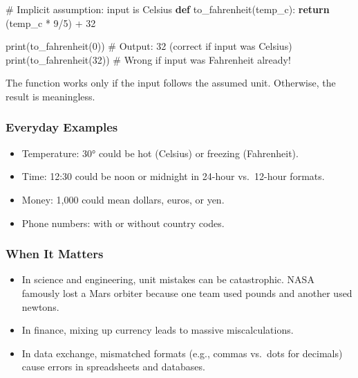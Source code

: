 \documentclass[
  letterpaper,
  DIV=11,
  numbers=noendperiod]{scrreprt}
\newenvironment{Shaded}{\begin{snugshade}}{\end{snugshade}}
\newcommand{\BuiltInTok}[1]{\textcolor[rgb]{0.00,0.23,0.31}{#1}}
\newcommand{\CommentTok}[1]{\textcolor[rgb]{0.37,0.37,0.37}{#1}}
\newcommand{\ControlFlowTok}[1]{\textcolor[rgb]{0.00,0.23,0.31}{\textbf{#1}}}
\newcommand{\DecValTok}[1]{\textcolor[rgb]{0.68,0.00,0.00}{#1}}
\newcommand{\KeywordTok}[1]{\textcolor[rgb]{0.00,0.23,0.31}{\textbf{#1}}}
\newcommand{\NormalTok}[1]{\textcolor[rgb]{0.00,0.23,0.31}{#1}}
\newcommand{\OperatorTok}[1]{\textcolor[rgb]{0.37,0.37,0.37}{#1}}
\providecommand{\tightlist}{%
  \setlength{\itemsep}{0pt}\setlength{\parskip}{0pt}}
\begin{document}
\begin{Shaded}
\begin{Highlighting}[]
\CommentTok{\# Implicit assumption: input is Celsius}
\KeywordTok{def}\NormalTok{ to\_fahrenheit(temp\_c):}
    \ControlFlowTok{return}\NormalTok{ (temp\_c }\OperatorTok{*} \DecValTok{9}\OperatorTok{/}\DecValTok{5}\NormalTok{) }\OperatorTok{+} \DecValTok{32}

\BuiltInTok{print}\NormalTok{(to\_fahrenheit(}\DecValTok{0}\NormalTok{))   }\CommentTok{\# Output: 32 (correct if input was Celsius)}
\BuiltInTok{print}\NormalTok{(to\_fahrenheit(}\DecValTok{32}\NormalTok{))  }\CommentTok{\# Wrong if input was Fahrenheit already!}
\end{Highlighting}
\end{Shaded}

The function works only if the input follows the assumed unit.
Otherwise, the result is meaningless.

\subsubsection{Everyday Examples}\label{everyday-examples-14}

\begin{itemize}
\tightlist
\item
  Temperature: 30° could be hot (Celsius) or freezing (Fahrenheit).
\item
  Time: 12:30 could be noon or midnight in 24-hour vs.~12-hour formats.
\item
  Money: 1,000 could mean dollars, euros, or yen.
\item
  Phone numbers: with or without country codes.
\end{itemize}

\subsubsection{When It Matters}\label{when-it-matters-13}

\begin{itemize}
\tightlist
\item
  In science and engineering, unit mistakes can be catastrophic. NASA
  famously lost a Mars orbiter because one team used pounds and another
  used newtons.
\item
  In finance, mixing up currency leads to massive miscalculations.
\item
  In data exchange, mismatched formats (e.g., commas vs.~dots for
  decimals) cause errors in spreadsheets and databases.
\end{itemize}
\end{document}
